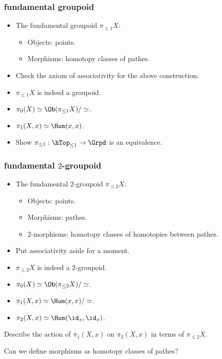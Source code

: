 \begin{frame}
	\frametitle{fundamental groupoid}

	\begin{itemize}
		\item 
			The \alert{fundamental groupoid} $\pi_{\le 1} X$:\pause
			\begin{itemize}
				\item Objects: points. \pause
				\item Morphisms: \alert{homotopy classes} of pathes. \pause
			\end{itemize}
		\item[]
			\begin{exe}
			Check the axiom of associativity for the above construction. \pause
			\end{exe}
		\item
			$\pi_{\le 1}X$ is indeed a groupoid. \pause
		\item
			$\pi_0(X) \simeq \Ob(\pi_{\le 1}X)/\simeq $. \pause
		\item
			$\pi_1(X,x) \simeq \Hom(x,x)$. \pause
		\item[]
			\begin{exe}
				Show $\pi_{\le 1}: \hTop_{\le 1} \to \Grpd$ is an equivalence.
			\end{exe}
	\end{itemize}
\end{frame}

\begin{frame}
	\frametitle{fundamental $2$-groupoid}

	\begin{itemize}
		\item 
			The \alert{fundamental $2$-groupoid} $\pi_{\le 2} X$:\pause
			\begin{itemize}
				\item Objects: points. \pause
				\item Morphisms: pathes. \pause
				\item 2-morphisms: \alert{homotopy classes} of homotopies between pathes. \pause
			\end{itemize}
		\item 
			Put associativity aside for a moment. \pause
		\item
			$\pi_{\le 2}X$ is indeed a $2$-groupoid. \pause
		\item
			$\pi_0(X) \simeq \Ob(\pi_{\le 2}X)/\simeq $. \pause
		\item
			$\pi_1(X,x) \simeq \Hom(x,x)/\simeq$. \pause
		\item
			$\pi_2(X,x) \simeq \Hom(\id_x,\id_x)$. \pause

	\end{itemize}

	\begin{exe}
		Describe the action of $\pi_1(X,x)$ on $\pi_2(X,x)$ in terms of $\pi_{\le 2}X$. \pause
	\end{exe}

	\begin{exe}
		Can we define morphisms as \alert{homotopy classes} of pathes?
	\end{exe}
\end{frame}

